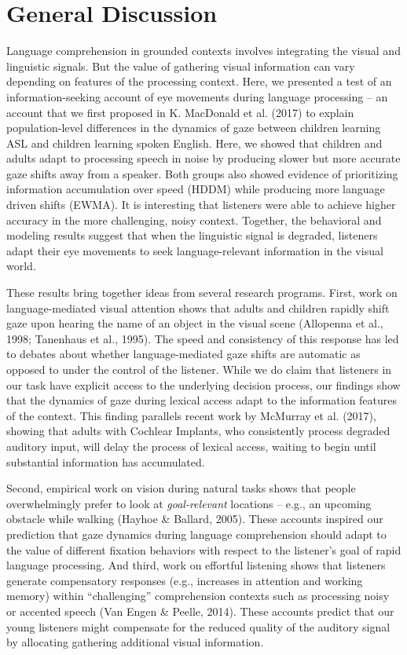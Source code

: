 \documentclass[10pt, letterpaper]{article}
\begin{document}
\section{General Discussion}\label{general-discussion}

Language comprehension in grounded contexts involves integrating the
visual and linguistic signals. But the value of gathering visual
information can vary depending on features of the processing context.
Here, we presented a test of an information-seeking account of eye
movements during language processing -- an account that we first
proposed in K. MacDonald et al. (2017) to explain population-level
differences in the dynamics of gaze between children learning ASL and
children learning spoken English. Here, we showed that children and
adults adapt to processing speech in noise by producing slower but more
accurate gaze shifts away from a speaker. Both groups also showed
evidence of prioritizing information accumulation over speed (HDDM)
while producing more language driven shifts (EWMA). It is interesting
that listeners were able to achieve higher accuracy in the more
challenging, noisy context. Together, the behavioral and modeling
results suggest that when the linguistic signal is degraded, listeners
adapt their eye movements to seek language-relevant information in the
visual world.

These results bring together ideas from several research programs.
First, work on language-mediated visual attention shows that adults and
children rapidly shift gaze upon hearing the name of an object in the
visual scene (Allopenna et al., 1998; Tanenhaus et al., 1995). The speed
and consistency of this response has led to debates about whether
language-mediated gaze shifts are automatic as opposed to under the
control of the listener. While we do claim that listeners in our task
have explicit access to the underlying decision process, our findings
show that the dynamics of gaze during lexical access adapt to the
information features of the context. This finding parallels recent work
by McMurray et al. (2017), showing that adults with Cochlear Implants,
who consistently process degraded auditory input, will delay the process
of lexical access, waiting to begin until substantial information has
accumulated.

Second, empirical work on vision during natural tasks shows that people
overwhelmingly prefer to look at \emph{goal-relevant} locations -- e.g.,
an upcoming obstacle while walking (Hayhoe \& Ballard, 2005). These
accounts inspired our prediction that gaze dynamics during language
comprehension should adapt to the value of different fixation behaviors
with respect to the listener's goal of rapid language processing. And
third, work on effortful listening shows that listeners generate
compensatory responses (e.g., increases in attention and working memory)
within ``challenging'' comprehension contexts such as processing noisy
or accented speech (Van Engen \& Peelle, 2014). These accounts predict
that our young listeners might compensate for the reduced quality of the
auditory signal by allocating gathering additional visual information.
\end{document}
